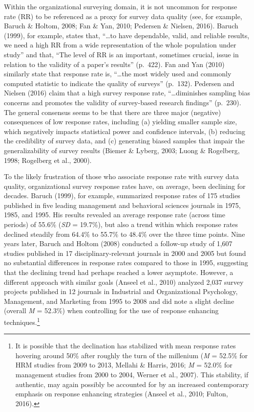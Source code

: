 \documentclass[
  man,mask]{apa7}
\begin{document}
Within the organizational surveying domain, it is not uncommon for response rate (RR) to be referenced as a proxy for survey data quality (see, for example, Baruch \& Holtom, 2008; Fan \& Yan, 2010; Pedersen \& Nielsen, 2016). Baruch (1999), for example, states that, ``\ldots to have dependable, valid, and reliable results, we need a high RR from a wide representation of the whole population under study'' and that, ``The level of RR is an important, sometimes crucial, issue in relation to the validity of a paper's results'' (p.~422). Fan and Yan (2010) similarly state that response rate is, ``\ldots the most widely used and commonly computed statistic to indicate the quality of surveys'' (p.~132). Pedersen and Nielsen (2016) claim that a high survey response rate, ``\ldots diminishes sampling bias concerns and promotes the validity of survey-based research findings'' (p.~230). The general consensus seems to be that there are three major (negative) consequences of low response rates, including (a) yielding smaller sample size, which negatively impacts statistical power and confidence intervals, (b) reducing the credibility of survey data, and (c) generating biased samples that impair the generalizability of survey results (Biemer \& Lyberg, 2003; Luong \& Rogelberg, 1998; Rogelberg et al., 2000).

To the likely frustration of those who associate response rate with survey data quality, organizational survey response rates have, on average, been declining for decades. Baruch (1999), for example, summarized response rates of 175 studies published in five leading management and behavioral sciences journals in 1975, 1985, and 1995. His results revealed an average response rate (across time periods) of 55.6\% (\emph{SD} = 19.7\%), but also a trend within which response rates declined steadily from 64.4\% to 55.7\% to 48.4\% over the three time points. Nine years later, Baruch and Holtom (2008) conducted a follow-up study of 1,607 studies published in 17 disciplinary-relevant journals in 2000 and 2005 but found no substantial differences in response rates compared to those in 1995, suggesting that the declining trend had perhaps reached a lower asymptote. However, a different approach with similar goals (Anseel et al., 2010) analyzed 2,037 survey projects published in 12 journals in Industrial and Organizational Psychology, Management, and Marketing from 1995 to 2008 and did note a slight decline (overall \emph{M} = 52.3\%) when controlling for the use of response enhancing techniques.\footnote{It is possible that the declination has stabilized with mean response rates hovering around 50\% after roughly the turn of the millenium (\emph{M} = 52.5\% for HRM studies from 2009 to 2013, Mellahi \& Harris, 2016; \emph{M} = 52.0\% for management studies from 2000 to 2004, Werner et al., 2007). This stability, if authentic, may again possibly be accounted for by an increased contemporary emphasis on response enhancing strategies (Anseel et al., 2010; Fulton, 2016).}
\end{document}
